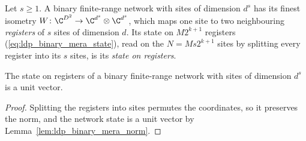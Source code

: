 \begin{definition}
    \label{def:ldp_register_mera}
    \leanok
    Let $s\ge1$. A binary finite-range network with sites of dimension $d^s$
    has its finest isometry $W\colon\C^{D^2}\to\C^{d^s}\otimes\C^{d^s}$, which
    maps one site to two neighbouring \emph{registers} of $s$ sites of
    dimension $d$. Its state on $M2^{k+1}$ registers
    (\ref{eq:ldp_binary_mera_state}), read on the $N=Ms2^{k+1}$ sites by
    splitting every register into its $s$ sites, is its \emph{state on
        registers}.
\end{definition}

\begin{lemma}
    \label{lem:ldp_register_mera_norm}
    \leanok
    The state on registers of a binary finite-range network with sites of
    dimension $d^s$ is a unit vector.
\end{lemma}
\begin{proof}
    \leanok
    Splitting the registers into sites permutes the coordinates, so it
    preserves the norm, and the network state is a unit vector by
    Lemma~\ref{lem:ldp_binary_mera_norm}.
\end{proof}


